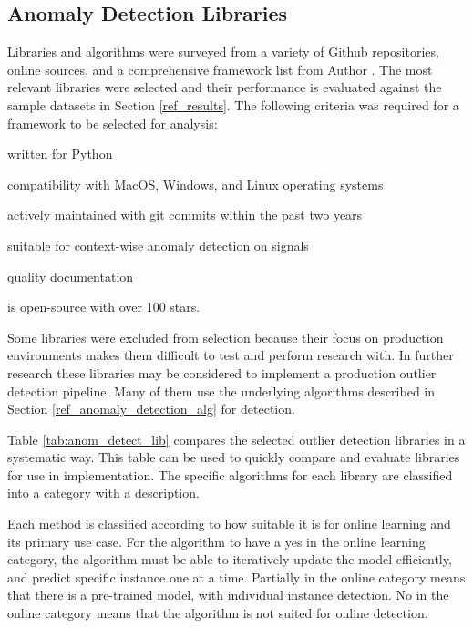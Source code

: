 \subsection{Anomaly Detection Libraries}
\label{ref_code_libraries}
 Libraries and algorithms were surveyed from a variety of Github repositories, online sources, and a comprehensive framework list from Author \cite{medico2020-ts-list}. The most relevant libraries were selected and their performance is evaluated against the sample datasets in Section \ref{ref_results}. The following criteria was required for a framework to be selected for analysis:
 \begin{inlinelist}
     \item written for Python
     \item compatibility with MacOS, Windows, and Linux operating systems
     \item actively maintained with git commits within the past two years
     \item suitable for context-wise anomaly detection on signals
     \item quality documentation
     \item is open-source with over 100 stars.
 \end{inlinelist}
 
 
Some libraries were excluded from selection because their focus on production environments makes them difficult to test and perform research with. In further research these libraries may be considered to implement a production outlier detection pipeline. Many of them use the underlying algorithms described in Section \ref{ref_anomaly_detection_alg} for detection. 
 
Table \ref{tab:anom_detect_lib} compares the selected outlier detection libraries in a systematic way. This table can be used to quickly compare and evaluate libraries for use in implementation. The specific algorithms for each library are classified into a category with a description.
 
Each method is classified according to how suitable it is for online learning and its primary use case. For the algorithm to have a yes in the online learning category, the algorithm must be able to iteratively update the model efficiently, and predict specific instance one at a time. Partially in the online category means that there is a pre-trained model, with individual instance detection. No in the online category means that the algorithm is not suited for online detection. 

